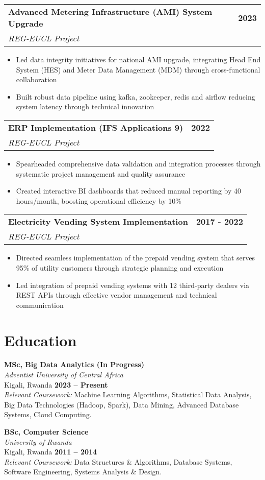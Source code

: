 \documentclass[11pt,letterpaper]{article}
\makeatletter
\newenvironment{cvproject}[3]{
	\noindent\begin{tabularx}{\linewidth}{@{}X@{\hspace{15pt}}r@{}}
		\textbf{\color{primarycolor}#1} & \textbf{\color{secondarycolor}#3} \\
		\textit{\color{secondarycolor}#2} & \\
	\end{tabularx}
	\vspace{4pt}
	\begin{itemize}[nosep,leftmargin=18pt,itemsep=3pt,topsep=0pt]
	}{
	\end{itemize}
	\vspace{8pt}
}
\newcommand{\education}[4]{
	\noindent\textbf{\color{primarycolor}#1}\\
	\textit{#2}\\
	#3 \hfill \textbf{#4}
	\vspace{6pt}
}
\makeatother
\begin{document}
	\begin{cvproject}{Advanced Metering Infrastructure (AMI) System Upgrade}{REG-EUCL Project}{2023}
		\item Led data integrity initiatives for national AMI upgrade, integrating Head End System (HES) and Meter Data Management (MDM) through cross-functional collaboration
		\item Built robust data pipeline using kafka, zookeeper, redis and airflow reducing system latency through technical innovation
	\end{cvproject}
	
	\begin{cvproject}{ERP Implementation (IFS Applications 9)}{REG-EUCL Project}{2022}
		\item Spearheaded comprehensive data validation and integration processes through systematic project management and quality assurance
		\item Created interactive BI dashboards that reduced manual reporting by 40 hours/month, boosting operational efficiency by 10\%
	\end{cvproject}
	
	\begin{cvproject}{Electricity Vending System Implementation}{REG-EUCL Project}{2017 - 2022}
		\item Directed seamless implementation of the prepaid vending system that serves 95\% of utility customers through strategic planning and execution
		\item Led integration of prepaid vending systems with 12 third-party dealers via REST APIs through effective vendor management and technical communication
	\end{cvproject}
	
	\section*{Education}
	
	\education{MSc, Big Data Analytics (In Progress)}{Adventist University of Central Africa}{Kigali, Rwanda}{2023 -- Present}\\
	\textit{Relevant Coursework:} Machine Learning Algorithms, Statistical Data Analysis, Big Data Technologies (Hadoop, Spark), Data Mining, Advanced Database Systems, Cloud Computing.
	
	\education{BSc, Computer Science}{University of Rwanda}{Kigali, Rwanda}{2011 -- 2014}\\
	\textit{Relevant Coursework:} Data Structures \& Algorithms, Database Systems, Software Engineering, Systems Analysis \& Design.
	
\end{document}
